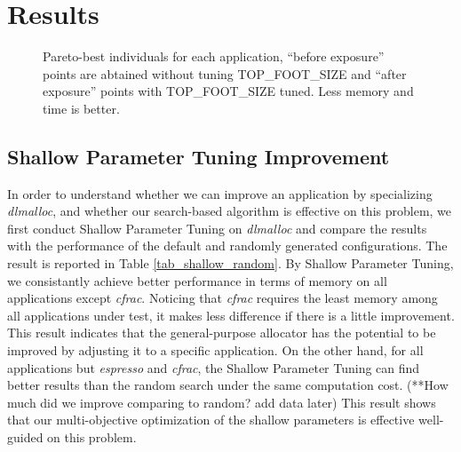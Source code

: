 
\section{Results}

\begin{figure*}[htbp]
	\centering
	\caption{Pareto-best individuals for each application, ``before exposure'' points are abtained without tuning TOP\_FOOT\_SIZE and ``after exposure'' points with TOP\_FOOT\_SIZE tuned. Less memory and time is better.}\label{fig_10}
\end{figure*}

\subsection{Shallow Parameter Tuning Improvement}

\begin{table}[hbtp]
\centering
\caption{Least memory consumption found by Shallow Parameter Tuning and Random Search (**waiting for results)}
\label{tab_shallow_random}
\end{table}

In order to understand whether we can improve an application by specializing \emph{dlmalloc}, and whether our search-based algorithm is effective on this problem, we first conduct Shallow Parameter Tuning on \emph{dlmalloc} and compare the results with the performance of the default and randomly generated configurations. The result is reported in Table \ref{tab_shallow_random}. By Shallow Parameter Tuning, we consistantly achieve better performance in terms of memory on all applications except \emph{cfrac}. Noticing that \emph{cfrac} requires the least memory among all applications under test, it makes less difference if there is a little improvement. This result indicates that the general-purpose allocator has the potential to be improved by adjusting it to a specific application. On the other hand, for all applications but \emph{espresso} and \emph{cfrac}, the Shallow Parameter Tuning can find better results than the random search under the same computation cost. (**How much did we improve comparing to random? add data later) This result shows that our multi-objective optimization of the shallow parameters is effective well-guided on this problem.

